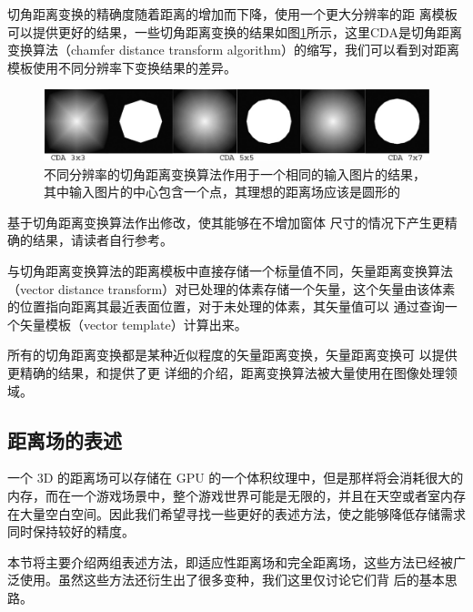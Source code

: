 切角距离变换的精确度随着距离的增加而下降，使用一个更大分辨率的距 离模板可以提供更好的结果，一些切角距离变换的结果如图\ref{f:df-multi-distance-transform}所示，这里CDA是切角距离变换算法（chamfer distance transform algorithm）的缩写，我们可以看到对距离模板使用不同分辨率下变换结果的差异。

\begin{figure}
\begin{fullwidth}
	\includegraphics[width=\thewidth]{figures/df/multi-distance-transform}
	\caption{不同分辨率的切角距离变换算法作用于一个相同的输入图片的结果，其中输入图片的中心包含一个点，其理想的距离场应该是圆形的}
	\label{f:df-multi-distance-transform}
\end{fullwidth}
\end{figure}

\cite{a:dead-reckoning}基于切角距离变换算法作出修改，使其能够在不增加窗体 尺寸的情况下产生更精确的结果，请读者自行参考。

与切角距离变换算法的距离模板中直接存储一个标量值不同，矢量距离变换算法（vector distance transform）对已处理的体素存储一个矢量，这个矢量由该体素的位置指向距离其最近表面位置，对于未处理的体素，其矢量值可以 通过查询一个矢量模板（vector template）计算出来。

所有的切角距离变换都是某种近似程度的矢量距离变换，矢量距离变换可 以提供更精确的结果，\cite{a:Euclidean-Distance-Mapping}和\cite{a:Vector-City-VDT}提供了更 详细的介绍，距离变换算法被大量使用在图像处理领域。



\subsection{距离场的表述}
一个 3D 的距离场可以存储在 GPU 的一个体积纹理中，但是那样将会消耗很大的内存，而在一个游戏场景中，整个游戏世界可能是无限的，并且在天空或者室内存在大量空白空间。因此我们希望寻找一些更好的表述方法，使之能够降低存储需求同时保持较好的精度。

本节将主要介绍两组表述方法，即适应性距离场和完全距离场，这些方法已经被广泛使用。虽然这些方法还衍生出了很多变种，我们这里仅讨论它们背 后的基本思路。




